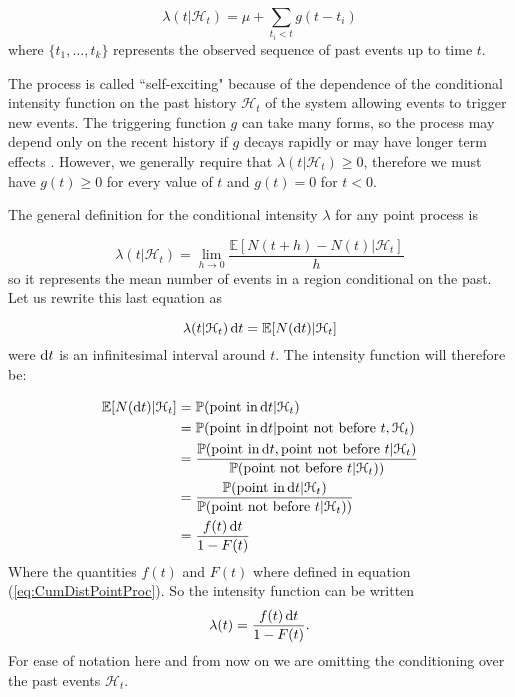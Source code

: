 \begin{equation*}
    \lambda(t|\mathcal{H}_t) = \mu + \sum_{t_i < t} g(t - t_i)
\end{equation*}
where $\{ t_1, \dots, t_k\}$ represents the observed sequence of past events up to time $t$.

The process is called ``self-exciting" because of the dependence of the conditional intensity function on the past history $\mathcal{H}_t$ of the system allowing events to trigger new events. The triggering function $g$ can take many forms, so the process may depend only on the recent history if $g$ decays rapidly or may have longer term effects \cite{Reinhart}. However, we generally require that $\lambda(t | \mathcal{H}_t)  \geq 0$, therefore we must have $g(t) \geq 0$ for every value of $t$ and $g(t) = 0$ for $t < 0$.

The general definition for the conditional intensity $\lambda$ for any point process is

\begin{equation*}
    \lambda(t | \mathcal{H}_t) = \lim_{h \to 0} \frac{\mathbb{E}[N(t+h) - N(t) | \mathcal{H}_t]}{h}
\end{equation*}
so it represents the mean number of events in a region conditional on the past.
Let us rewrite this last equation as \cite{Rasmussen}

\begin{equation*}
    \lambda(t | \mathcal{H}_t) \operatorname{d}\!{t} = \mathbb{E}[N(\operatorname{d}\!{t}) | \mathcal{H}_t]
\end{equation*}
were $\operatorname{d}\!{t}$ is an infinitesimal interval around $t$.
The intensity function will therefore be:

\begin{align*}
    \mathbb{E}[N(\operatorname{d}\!{t}) | \mathcal{H}_t] &= \mathbb{P}(\textrm{point in} \operatorname{d}\!{t} | \mathcal{H}_t) \\
    & = \mathbb{P}(\textrm{point in} \operatorname{d}\!{t} | \textrm{point not before } t, \mathcal{H}_t) \\
    & = \frac{\mathbb{P}(\textrm{point in} \operatorname{d}\!{t}, \textrm{point not before } t | \mathcal{H}_t)}{\mathbb{P}(\textrm{point not before } t | \mathcal{H}_t))} \\
    & = \frac{\mathbb{P}(\textrm{point in} \operatorname{d}\!{t} | \mathcal{H}_t)}{\mathbb{P}(\textrm{point not before } t | \mathcal{H}_t))} \\
    & = \frac{f(t) \operatorname{d}\!{t}}{1 - F(t)}
\end{align*}
Where the quantities $f(t)$ and $F(t)$ where defined in equation (\ref{eq:CumDistPointProc}). So the intensity function can be written
\begin{equation}\label{eq:IntFun}
    \lambda(t) = \frac{f(t) \operatorname{d}\!{t}}{1 - F(t)}.
\end{equation}
For ease of notation here and from now on we are omitting the conditioning over the past events $\mathcal{H}_t$.

